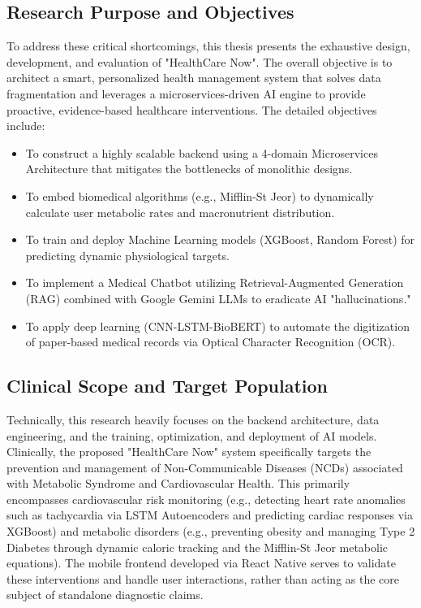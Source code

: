 \documentclass[journal, a4paper]{IEEEtran}
\begin{document}
\subsection{Research Purpose and Objectives}
To address these critical shortcomings, this thesis presents the exhaustive design, development, and evaluation of "HealthCare Now". The overall objective is to architect a smart, personalized health management system that solves data fragmentation and leverages a microservices-driven AI engine to provide proactive, evidence-based healthcare interventions. The detailed objectives include:
\begin{itemize}
    \item To construct a highly scalable backend using a 4-domain Microservices Architecture that mitigates the bottlenecks of monolithic designs.
    \item To embed biomedical algorithms (e.g., Mifflin-St Jeor) to dynamically calculate user metabolic rates and macronutrient distribution.
    \item To train and deploy Machine Learning models (XGBoost, Random Forest) for predicting dynamic physiological targets.
    \item To implement a Medical Chatbot utilizing Retrieval-Augmented Generation (RAG) combined with Google Gemini LLMs to eradicate AI "hallucinations."
    \item To apply deep learning (CNN-LSTM-BioBERT) to automate the digitization of paper-based medical records via Optical Character Recognition (OCR).
\end{itemize}

\subsection{Clinical Scope and Target Population}
Technically, this research heavily focuses on the backend architecture, data engineering, and the training, optimization, and deployment of AI models. Clinically, the proposed "HealthCare Now" system specifically targets the prevention and management of Non-Communicable Diseases (NCDs) associated with Metabolic Syndrome and Cardiovascular Health. This primarily encompasses cardiovascular risk monitoring (e.g., detecting heart rate anomalies such as tachycardia via LSTM Autoencoders and predicting cardiac responses via XGBoost) and metabolic disorders (e.g., preventing obesity and managing Type 2 Diabetes through dynamic caloric tracking and the Mifflin-St Jeor metabolic equations). The mobile frontend developed via React Native serves to validate these interventions and handle user interactions, rather than acting as the core subject of standalone diagnostic claims.
\end{document}
